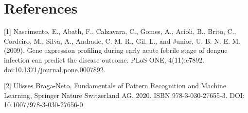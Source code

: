\documentclass[final]{article}
\begin{document}
\section*{References}


\medskip

{
\small

[1] Nascimento, E., Abath, F., Calzavara, C., Gomes, A., Acioli, B., Brito, C., Cordeiro, M., Silva, A., Andrade, C. M. R., Gil, L., and Junior, U. B.-N. E. M. (2009). Gene expression profiling during early acute febrile stage of dengue infection can predict the disease outcome. PLoS ONE, 4(11):e7892. doi:10.1371/journal.pone.0007892.

[2] Ulisses Braga-Neto, Fundamentals of Pattern Recognition and Machine Learning, Springer Nature Switzerland AG, 2020. ISBN 978-3-030-27655-3. DOI: 10.1007/978-3-030-27656-0
}
\end{document}
